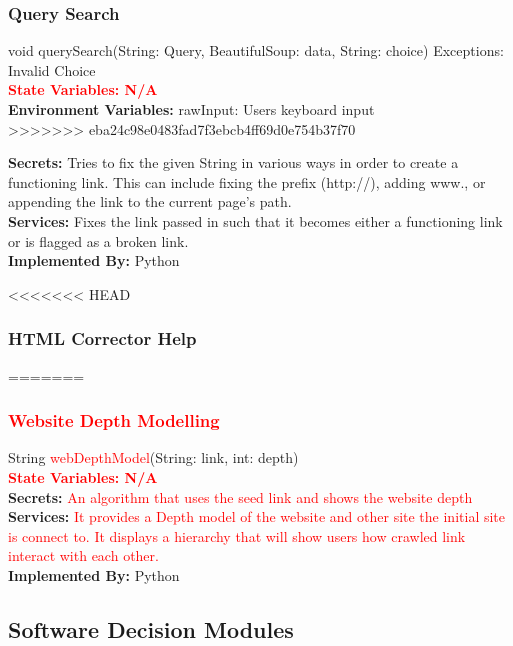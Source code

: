 \documentclass[titlepage]{article}
\begin{document}
{\subsubsection{Query Search}
void querySearch(String: Query, BeautifulSoup: data, String: choice) Exceptions: Invalid Choice\\
\textcolor{red}{\textbf{State Variables: N/A}}\\
\textbf{Environment Variables:}
rawInput: Users keyboard input\\
>>>>>>> eba24c98e0483fad7f3ebcb4ff69d0e754b37f70

\textbf{Secrets:}
Tries to fix the given String in various ways in order to create a functioning link. This can include fixing the prefix (http://), adding www., or appending the link to the current page's path.\\

\textbf{Services:}
Fixes the link passed in such that it becomes either a functioning link or is flagged as a broken link.\\

\textbf{Implemented By:}
Python

<<<<<<< HEAD

\subsubsection{HTML Corrector Help}
=======
\subsubsection{\textcolor{red}{Website Depth Modelling}}
String \textcolor{red}{webDepthModel}(String: link, int: depth)\\
\textcolor{red}{\textbf{State Variables: N/A}}\\
\textbf{Secrets:}
 \textcolor{red}{An algorithm that uses the seed link and shows the website depth}\\
 
\textbf{Services:}
\textcolor{red}{It provides a Depth model of the website and other site the initial site is connect to. It displays a hierarchy that will show users how crawled link interact with each other.}\\

\textbf{Implemented By:}
Python

\subsection{Software Decision Modules}
}
\end{document}

